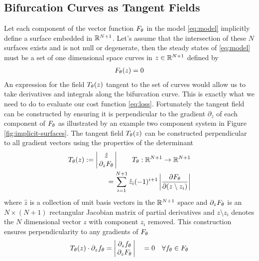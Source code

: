 \subsection{Bifurcation Curves as Tangent Fields}
\label{appendix:tangent-fields}

Let each component of the vector function $F_{\theta}$ in the model \eqref{eq:model} implicitly define a surface embedded in $\mathbb{R}^{N+1}$. Let's assume that the intersection of these $N$ surfaces exists and is not null or degenerate, then the steady states of \eqref{eq:model} must be a set of one dimensional space curves in $z\in\mathbb{R}^{N+1}$ defined by
\begin{align}
    F_{\theta}(z) = 0
\end{align}
An expression for the field $T_{\theta}(z)$ tangent to the set of curves would allow us to take derivatives and integrals along the bifurcation curve. This is exactly what we need to do to evaluate our cost function \ref{eq:loss}. Fortunately the tangent field can be constructed by ensuring it is perpendicular to the gradient $\partial_z$ of each component of $F_{\theta}$ as illustrated by an example two component system in Figure \ref{fig:implicit-surfaces}. The tangent field $T_{\theta}(z)$ can be constructed perpendicular to all gradient vectors using the properties of the determinant \cite{Goldman2005CurvatureSurfaces}
\begin{align}
    T_{\theta}(z):=
    \label{eq:tangent-field}
    \left|\begin{matrix}
        \hat{z} \\
        \,\partial_{z}F_{\theta}\,
    \end{matrix}\right|
    \qquad T_{\theta} : \mathbb{R}^{N+1}\rightarrow\mathbb{R}^{N+1}\\
    =\sum_{i=1}^{N+1}\hat{z}_{i}(-1)^{i+1} \left|\frac{\partial F_{\theta}}{\partial(z\setminus z_{i}) }\right|
\end{align}
where $\hat{z}$ is a collection of unit basis vectors in the $\mathbb{R}^{N+1}$ space and $\partial_{z}F_{\theta}$ is an $N\times(N+1)$ rectangular Jacobian matrix of partial derivatives and $z\setminus z_{i}$ denotes the $N$ dimensional vector $z$ with component $z_{i}$ removed. This construction ensures perpendicularity to any gradients of $F_{\theta}$
\begin{align}
    T_{\theta}(z)\cdot\partial_z f_{\theta} =
    \left|\begin{matrix}
        \partial_z f_{\theta} \\
        \,\partial_{z}F_{\theta}\,
    \end{matrix}\right|
    \quad =0 \quad\forall f_{\theta}\in F_{\theta}
\end{align}
